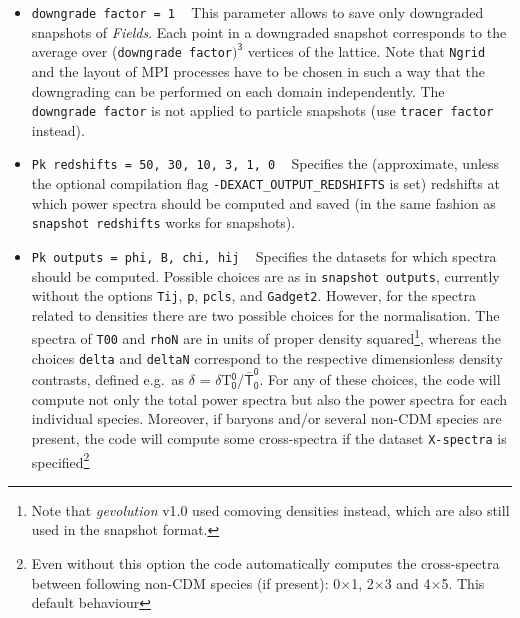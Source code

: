 \documentclass[a4paper,10pt]{article}
\begin{document}
\begin{itemize}
 If the particle template is a crystal only certain choices of \texttt{tracer factor} will result in a crystal structure for the
 \textit{tracer particles}. These are 1, 2, 8, 16, 64 for the simple cubic templates, 1, 4, 8, 32 for the face-centered cubic one,
 and 1, 2, 4, 16 for the body-centered cubic one.
 \item[] \hspace{-25pt}\texttt{downgrade factor = 1} ~ This parameter allows to save only downgraded snapshots of \textit{Fields}. Each
 point in a downgraded snapshot corresponds to the average over (\texttt{downgrade factor}$)^\mathsf{3}$ vertices of the lattice. Note that
 \texttt{Ngrid} and the layout of MPI processes have to be chosen in such a way that the downgrading can be performed on each domain
 independently. The \texttt{downgrade factor} is not applied to particle snapshots (use \texttt{tracer factor} instead).
 \item[] \hspace{-25pt}\texttt{Pk redshifts = 50, 30, 10, 3, 1, 0} ~ Specifies the (approximate, unless the optional compilation flag
 \texttt{-DEXACT\_OUTPUT\_REDSHIFTS} is set) redshifts at which power spectra should be
 computed and saved (in the same fashion as \texttt{snapshot redshifts} works for snapshots).
 \item[] \hspace{-25pt}\texttt{Pk outputs = phi, B, chi, hij} ~ Specifies the datasets for which spectra should be computed. Possible
 choices are as in \texttt{snapshot outputs}, currently without the options \texttt{Tij}, \texttt{p}, \texttt{pcls}, and \texttt{Gadget2}.
 However, for the spectra related to densities there are two possible choices for the normalisation. The spectra of \texttt{T00} and
 \texttt{rhoN} are in units of proper density squared\footnote{Note that \textit{gevolution} v1.0 used comoving densities instead, which are
 also still used in the snapshot format.}, whereas the choices \texttt{delta} and \texttt{deltaN} correspond to the respective dimensionless
 density contrasts, defined e.g.\ as $\mathsf{\delta}$ = $\mathsf{\delta}$T$^\mathsf{0}_\mathsf{0}$/$\mathsf{\bar{T}^0_0}$. For any of these
 choices, the code will compute not only the total power spectra but also the power spectra for each individual species. Moreover, if
 baryons and/or several non-CDM species are present, the code will compute some cross-spectra if the dataset \texttt{X-spectra} is specified\footnote{Even without this option the code automatically
computes the cross-spectra between following non-CDM species (if present): 0$\times$1, 2$\times$3 and 4$\times$5. This default behaviour
}
\end{itemize}
\end{document}
